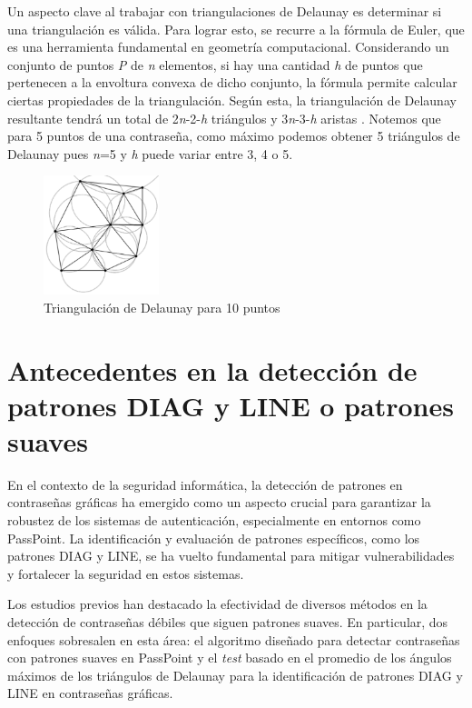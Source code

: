 \documentclass[12pt]{report}
\begin{document}
	
	Un aspecto clave al trabajar con triangulaciones de Delaunay es determinar si una triangulación es válida. Para lograr esto, se recurre a la fórmula de Euler, que es una herramienta fundamental en geometría computacional. Considerando un conjunto de puntos \textit{P} de \textit{n} elementos, si hay una cantidad \textit{h} de puntos que pertenecen a la envoltura convexa de dicho conjunto, la fórmula permite calcular ciertas propiedades de la triangulación. Según esta, la triangulación de Delaunay resultante tendrá un total de 2\textit{n}-2-\textit{h} triángulos y 3\textit{n}-3-\textit{h} aristas \cite{29}. Notemos que para  5 puntos de una contraseña, como máximo podemos obtener 5 triángulos de Delaunay pues \textit{n}=5 y \textit{h} puede variar entre 3, 4 o 5.
	
	\begin{figure}[ht]
		\centering
		\includegraphics[width=0.3\textwidth]{td_10pts.png}
		\caption{Triangulación de Delaunay para 10 puntos}
		\label{Triangulación}
	\end{figure}

\section{Antecedentes en la detección de patrones DIAG y LINE o patrones suaves}	
	En el contexto de la seguridad informática, la detección de patrones en contraseñas gráficas ha emergido como un aspecto crucial para garantizar la robustez de los sistemas de autenticación, especialmente en entornos como PassPoint. La identificación y evaluación de patrones específicos, como los patrones DIAG y LINE, se ha vuelto fundamental para mitigar vulnerabilidades y fortalecer la seguridad en estos sistemas.
	
	Los estudios previos han destacado la efectividad de diversos métodos en la detección de contraseñas débiles que siguen patrones suaves. En particular, dos enfoques sobresalen en esta área: el algoritmo diseñado para detectar contraseñas con patrones suaves en PassPoint \cite{3} y el \textit{test} basado en el promedio de los ángulos máximos de los triángulos de Delaunay \cite{13} para la identificación de patrones DIAG y LINE en contraseñas gráficas.
	
\end{document}
